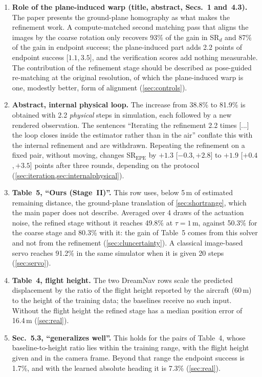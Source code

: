 \documentclass[10pt,twocolumn,letterpaper]{article}
\newcommand{\SRd}{SR$_{d}$}
\newcommand{\SRe}{SR$_{\mathrm{EPE}}$}
\newcommand{\ci}[2]{{\scriptsize[\ensuremath{#1},\,\ensuremath{#2}]}}
\begin{document}
\begin{enumerate}[leftmargin=*,itemsep=2pt,topsep=3pt]
\item \textbf{Role of the plane-induced warp (title, abstract, Secs.~1 and~4.3).} The paper presents the ground-plane homography as what makes the refinement work. A compute-matched second matching pass that aligns the images by the coarse rotation only recovers 93\% of the gain in \SRd{} and 87\% of the gain in endpoint success; the plane-induced part adds 2.2 points of endpoint success \ci{1.1}{3.5}, and the verification scores add nothing measurable. The contribution of the refinement stage should be described as pose-guided re-matching at the original resolution, of which the plane-induced warp is one, modestly better, form of alignment (\cref{sec:controls}).
\item \textbf{Abstract, internal \vs physical loop.} The increase from 38.8\% to 81.9\% is obtained with 2.2 \emph{physical} steps in simulation, each followed by a new rendered observation. The sentences ``Iterating the refinement 2.2 times [...] the loop closes inside the estimator rather than in the air'' conflate this with the internal refinement and are withdrawn. Repeating the refinement on a fixed pair, without moving, changes \SRe{} by \ensuremath{+1.3}{} \ci{\ensuremath{-0.3}}{\ensuremath{+2.8}} to \ensuremath{+1.9}{} \ci{\ensuremath{+0.4}}{\ensuremath{+3.5}} points after three rounds, depending on the protocol (\cref{sec:iteration,sec:internalphysical}).
\item \textbf{Table~5, ``Ours (Stage~II)''.} This row uses, below 5\,m of estimated remaining distance, the ground-plane translation of \cref{sec:shortrange}, which the main paper does not describe. Averaged over 4 draws of the actuation noise, the refined stage without it reaches 49.8\% at $\tau{=}1$\,m, against 50.3\% for the coarse stage and 80.3\% with it: the gain of Table~5 comes from this solver and not from the refinement (\cref{sec:cluncertainty}). A classical image-based servo reaches 91.2\% in the same simulator when it is given 20 steps (\cref{sec:servo}).
\item \textbf{Table~4, flight height.} The two DreamNav rows scale the predicted displacement by the ratio of the flight height reported by the aircraft (60\,m) to the height of the training data; the baselines receive no such input. Without the flight height the refined stage has a median position error of 16.4\,m (\cref{sec:real}).
\item \textbf{Sec.~5.3, ``generalizes well''.} This holds for the pairs of Table~4, whose baseline-to-height ratio lies within the training range, with the flight height given and in the camera frame. Beyond that range the endpoint success is 1.7\%, and with the learned absolute heading it is 7.3\% (\cref{sec:real}).

\end{enumerate}
\end{document}
